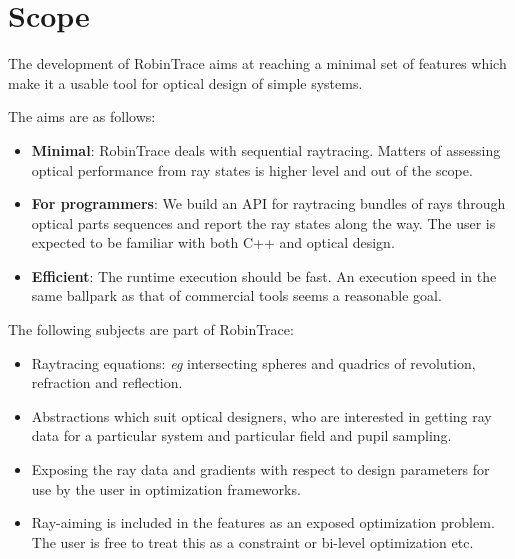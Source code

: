 \section{Scope}
The development of RobinTrace aims at reaching a minimal set of features which
make it a usable tool for optical design of simple systems.

The aims are as follows:
\begin{itemize}
\item \textbf{Minimal}: RobinTrace deals with sequential raytracing. Matters of
assessing optical performance from ray states is higher level and out of the
scope.
\item \textbf{For programmers}: We build an API for raytracing bundles of
rays through optical parts sequences and report the ray states along the way.
The user is expected to be familiar with both C++ and optical design.
\item \textbf{Efficient}: The runtime execution should be fast. An
execution speed in the same ballpark as that of commercial tools seems
a reasonable goal.
\end{itemize}

The following subjects are part of RobinTrace:
\begin{itemize}
\item Raytracing equations: \emph{eg} intersecting spheres and quadrics of
revolution, refraction and reflection.
\item Abstractions which suit optical designers, who are interested in
getting ray data for a particular system and particular field and pupil
sampling.
\item Exposing the ray data and gradients with respect to design
parameters for use by the user in optimization frameworks.
\item Ray-aiming is included in the features as an exposed optimization
problem. The user is free to treat this as a constraint or bi-level
optimization etc.
\end{itemize}


